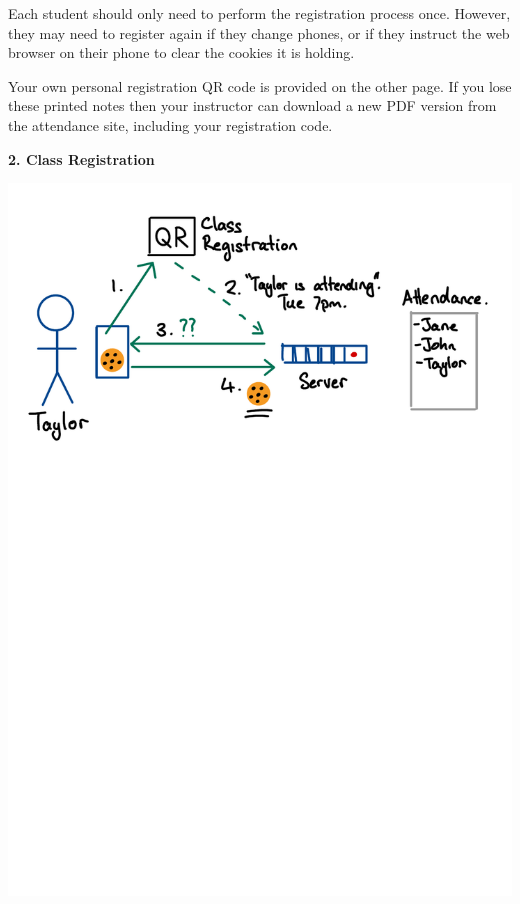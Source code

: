 \begin{minipage}[t]{\dimexpr0.5\linewidth-1em}
Each student should only need to perform the registration process once.
However, they may need to register again if they change phones,
or if they instruct the web browser on their phone to clear the cookies it is holding.

Your own personal registration QR code is provided on the other page.
If you lose these printed notes then your instructor can download a new PDF version
from the attendance site, including your registration code.
\end{minipage}
\hspace{2em}
\begin{minipage}[t]{\dimexpr0.5\linewidth-1em}
\textbf{2. Class Registration}
\begin{center}
\includegraphics[scale=0.4]{figure/fig-class-registration.pdf}


\end{center}
\end{minipage}
